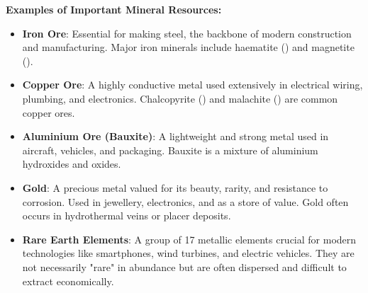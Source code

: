 \textbf{Examples of Important Mineral Resources:}

\begin{itemize}
    \item \textbf{Iron Ore}:  Essential for making steel, the backbone of modern construction and manufacturing.  Major iron minerals include haematite () and magnetite ().
    \item \textbf{Copper Ore}:  A highly conductive metal used extensively in electrical wiring, plumbing, and electronics.  Chalcopyrite () and malachite () are common copper ores.
    \item \textbf{Aluminium Ore (Bauxite)}:  A lightweight and strong metal used in aircraft, vehicles, and packaging. Bauxite is a mixture of aluminium hydroxides and oxides.
    \item \textbf{Gold}:  A precious metal valued for its beauty, rarity, and resistance to corrosion. Used in jewellery, electronics, and as a store of value. Gold often occurs in hydrothermal veins or placer deposits.
    \item \textbf{Rare Earth Elements}:  A group of 17 metallic elements crucial for modern technologies like smartphones, wind turbines, and electric vehicles.  They are not necessarily "rare" in abundance but are often dispersed and difficult to extract economically.
\end{itemize}

